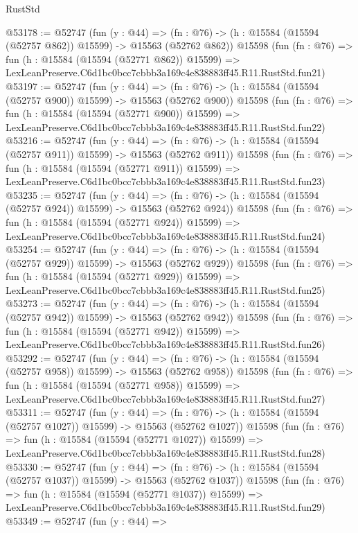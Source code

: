 \begin{lexlean}{RustStd}
\begin{coremodule}
@53178 := @52747
    (fun (y : @44) =>
    (fn : @76) -> (h : @15584 (@15594 (@52757 @862)) @15599) -> @15563 (@52762 @862))
    @15598
    (fun (fn : @76) =>
    fun (h : @15584 (@15594 (@52771 @862)) @15599) =>
    LexLeanPreserve.C6d1bc0bcc7cbbb3a169c4e838883ff45.R11.RustStd.fun21)
@53197 := @52747
    (fun (y : @44) =>
    (fn : @76) -> (h : @15584 (@15594 (@52757 @900)) @15599) -> @15563 (@52762 @900))
    @15598
    (fun (fn : @76) =>
    fun (h : @15584 (@15594 (@52771 @900)) @15599) =>
    LexLeanPreserve.C6d1bc0bcc7cbbb3a169c4e838883ff45.R11.RustStd.fun22)
@53216 := @52747
    (fun (y : @44) =>
    (fn : @76) -> (h : @15584 (@15594 (@52757 @911)) @15599) -> @15563 (@52762 @911))
    @15598
    (fun (fn : @76) =>
    fun (h : @15584 (@15594 (@52771 @911)) @15599) =>
    LexLeanPreserve.C6d1bc0bcc7cbbb3a169c4e838883ff45.R11.RustStd.fun23)
@53235 := @52747
    (fun (y : @44) =>
    (fn : @76) -> (h : @15584 (@15594 (@52757 @924)) @15599) -> @15563 (@52762 @924))
    @15598
    (fun (fn : @76) =>
    fun (h : @15584 (@15594 (@52771 @924)) @15599) =>
    LexLeanPreserve.C6d1bc0bcc7cbbb3a169c4e838883ff45.R11.RustStd.fun24)
@53254 := @52747
    (fun (y : @44) =>
    (fn : @76) -> (h : @15584 (@15594 (@52757 @929)) @15599) -> @15563 (@52762 @929))
    @15598
    (fun (fn : @76) =>
    fun (h : @15584 (@15594 (@52771 @929)) @15599) =>
    LexLeanPreserve.C6d1bc0bcc7cbbb3a169c4e838883ff45.R11.RustStd.fun25)
@53273 := @52747
    (fun (y : @44) =>
    (fn : @76) -> (h : @15584 (@15594 (@52757 @942)) @15599) -> @15563 (@52762 @942))
    @15598
    (fun (fn : @76) =>
    fun (h : @15584 (@15594 (@52771 @942)) @15599) =>
    LexLeanPreserve.C6d1bc0bcc7cbbb3a169c4e838883ff45.R11.RustStd.fun26)
@53292 := @52747
    (fun (y : @44) =>
    (fn : @76) -> (h : @15584 (@15594 (@52757 @958)) @15599) -> @15563 (@52762 @958))
    @15598
    (fun (fn : @76) =>
    fun (h : @15584 (@15594 (@52771 @958)) @15599) =>
    LexLeanPreserve.C6d1bc0bcc7cbbb3a169c4e838883ff45.R11.RustStd.fun27)
@53311 := @52747
    (fun (y : @44) =>
    (fn : @76) -> (h : @15584 (@15594 (@52757 @1027)) @15599) -> @15563 (@52762 @1027))
    @15598
    (fun (fn : @76) =>
    fun (h : @15584 (@15594 (@52771 @1027)) @15599) =>
    LexLeanPreserve.C6d1bc0bcc7cbbb3a169c4e838883ff45.R11.RustStd.fun28)
@53330 := @52747
    (fun (y : @44) =>
    (fn : @76) -> (h : @15584 (@15594 (@52757 @1037)) @15599) -> @15563 (@52762 @1037))
    @15598
    (fun (fn : @76) =>
    fun (h : @15584 (@15594 (@52771 @1037)) @15599) =>
    LexLeanPreserve.C6d1bc0bcc7cbbb3a169c4e838883ff45.R11.RustStd.fun29)
@53349 := @52747
    (fun (y : @44) =>

\end{coremodule}
\end{lexlean}
